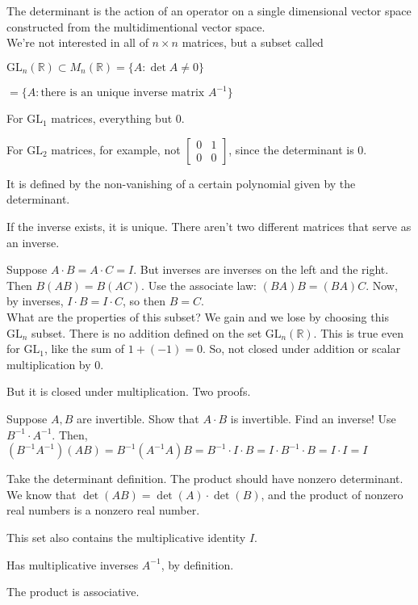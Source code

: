 \documentclass[12pt]{article}
\newcommand{\RR}{\mathbb{R}}
\newcommand{\GL}{\text{GL}}
\newcommand{\inv}[1]{#1^{-1}}
\theoremstyle{definition}
\begin{document}
The determinant is the action of an operator on a single dimensional vector space constructed
from the multidimentional vector space.
\\

We're not interested in all of \(n \times n\) matrices, but a subset called

\(\GL_n(\RR)\subset M_n(\RR) = \{A: \det A\neq 0\} \)

\(= \{A: \text{there is an unique inverse matrix }\inv{A}\} \)

For \(\GL_1\) matrices, everything but 0.

For \(\GL_2\) matrices, for example, not \(\left[\begin{smallmatrix}
    0 & 1\\
    0 & 0
\end{smallmatrix}\right]\), since the determinant is 0.

It is defined by the non-vanishing of a certain polynomial given by the determinant.

If the inverse exists, it is unique. There aren't two different matrices that serve as an inverse.

Suppose \(A\cdot B = A\cdot C = I\). But inverses are inverses on the left and the right.
Then \(B(AB) = B(AC)\). Use the associate law: \((BA)B = (BA)C\). Now, by inverses,
\(I\cdot B = I\cdot C\), so then \(B = C\).
\\

What are the properties of this subset? We gain and we lose by choosing this \(\GL_n\) subset. 
There is no addition defined on the set \(\GL_n(\RR)\).
This is true even for \(\GL_1\), like the sum of \(1 + (-1) = 0\).
So, not closed under addition or scalar multiplication by 0.

But it is closed under multiplication. Two proofs.

Suppose \(A, B\) are invertible. Show that \(A\cdot B\) is invertible. Find an inverse!
Use \(\inv{B}\cdot\inv{A}\). Then, \((\inv{B}\inv{A})(AB)=\inv{B}(\inv{A}A)B=\inv{B}\cdot I\cdot B=I\cdot\inv{B}\cdot B=I\cdot I=I\)

Take the determinant definition. The product should have nonzero determinant. We know that
\(\det(AB) = \det(A)\cdot\det(B)\), and the product of nonzero real numbers is a nonzero real number.

This set also contains the multiplicative identity \(I\).

Has multiplicative inverses \(\inv{A}\), by definition.

The product is associative.
\end{document}
